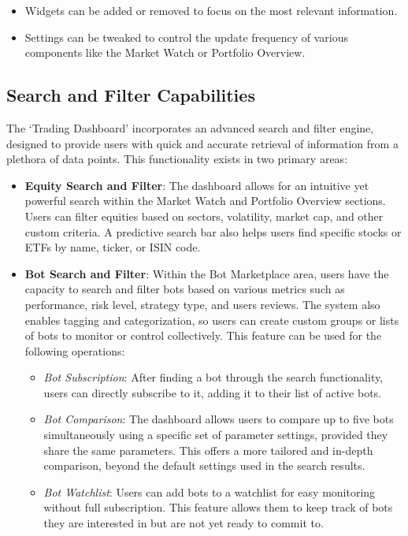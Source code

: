 \begin{itemize}
  \item Widgets can be added or removed to focus on the most relevant information.
  
  \item Settings can be tweaked to control the update frequency of various components like the Market Watch or Portfolio Overview.
\end{itemize}

\subsection{Search and Filter Capabilities}
\label{sec:search-filter-ui}

The `Trading Dashboard' incorporates an advanced search and filter engine, designed to provide users with quick and accurate retrieval of information from a plethora of data points. This functionality exists in two primary areas:

\begin{itemize}
  \item \textbf{Equity Search and Filter}: The dashboard allows for an intuitive yet powerful search within the Market Watch and Portfolio Overview sections. Users can filter equities based on sectors, volatility, market cap, and other custom criteria. A predictive search bar also helps users find specific stocks or ETFs by name, ticker, or ISIN code.

  \item \textbf{Bot Search and Filter}: Within the Bot Marketplace area, users have the capacity to search and filter bots based on various metrics such as performance, risk level, strategy type, and users reviews. The system also enables tagging and categorization, so users can create custom groups or lists of bots to monitor or control collectively. This feature can be used for the following operations:
  \begin{itemize}
    \item \textit{Bot Subscription}: After finding a bot through the search functionality, users can directly subscribe to it, adding it to their list of active bots.
  
    \item \textit{Bot Comparison}: The dashboard allows users to compare up to five bots simultaneously using a specific set of parameter settings, provided they share the same parameters. This offers a more tailored and in-depth comparison, beyond the default settings used in the search results.

    \item \textit{Bot Watchlist}: Users can add bots to a watchlist for easy monitoring without full subscription. This feature allows them to keep track of bots they are interested in but are not yet ready to commit to.
  \end{itemize}
\end{itemize}


